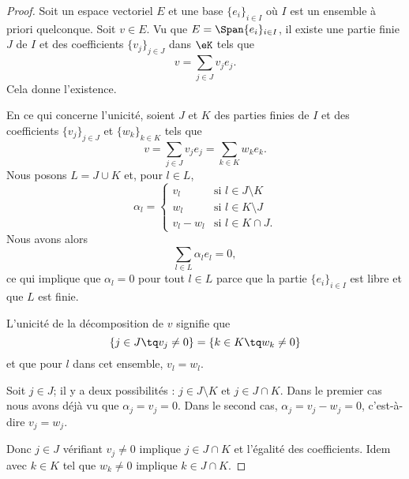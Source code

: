 \begin{proof}
    Soit un espace vectoriel \( E\) et une base \( \{ e_i \}_{i\in I}\) où \( I\) est un ensemble à priori quelconque. Soit \( v\in E\). Vu que \( E=\Span\{ e_i \}_{i\in I}\), il existe une partie finie \( J\) de \( I\) et des coefficients \( \{ v_j \}_{j\in J}\) dans \( \eK\) tels que
    \begin{equation}
        v=\sum_{j\in J}v_je_j.
    \end{equation}
    Cela donne l'existence.

    En ce qui concerne l'unicité, soient \( J \) et \( K\) des parties finies de \( I\) et des coefficients \( \{ v_j \}_{j\in J}\) et \( \{ w_{k} \}_{k\in K}\) tels que
    \begin{equation}
        v=\sum_{j\in J}v_je_j=\sum_{k\in K}w_{k}e_{k}.
    \end{equation}
    Nous posons \( L=J\cup K\) et, pour \( l\in L\),
    \begin{equation}
        \alpha_l=\begin{cases}
            v_l    &   \text{si } l\in J\setminus K\\
            w_l    &    \text{si } l\in K\setminus J\\
            v_l-w_l    &    \text{si } l\in K\cap J.
        \end{cases}
    \end{equation}
    Nous avons alors
    \begin{equation}
        \sum_{l\in L}\alpha_le_l=0,
    \end{equation}
    ce qui implique que \( \alpha_l=0\) pour tout \( l\in L\) parce que la partie \( \{ e_i \}_{i\in I}\) est libre et que \( L\) est finie.

    L'unicité de la décomposition de \( v\) signifie que
    \begin{equation}
        \{ j\in J \tq v_j\neq 0 \}=\{ k\in K\tq w_k\neq 0 \}
    \end{equation}
    et que pour \( l\) dans cet ensemble, \( v_l=w_l\).

    Soit \( j\in J\); il y a deux possibilités : \( j\in J\setminus K\) et \( j\in J\cap K\). Dans le premier cas nous avons déjà vu que \( \alpha_j=v_j=0\). Dans le second cas, \( \alpha_j=v_j-w_j=0\), c'est-à-dire \( v_j=w_j\).

    Donc \( j\in J\) vérifiant \( v_j\neq 0\) implique \( j\in J\cap K\) et l'égalité des coefficients. Idem avec \( k\in K\) tel que \( w_k\neq 0\) implique \( k\in J\cap K\).
\end{proof}

